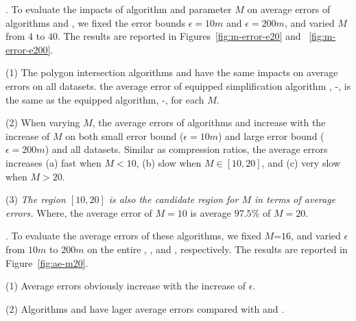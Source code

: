 .
To evaluate the impacts of algorithm \rpia and parameter $M$ on average errors of algorithms \cist and \cista, we fixed the error bounds {$\epsilon =10m$} and $\epsilon =200m$, and varied $M$ from $4$ to $40$.
The results are reported in Figures~\ref{fig:m-error-e20} and ~\ref{fig:m-error-e200}.


\ni(1) The polygon intersection algorithms \rpia and \cpia have the same impacts on average errors on all datasets. \eg the average error of \rpia equipped simplification algorithm \cist, \ie \cist-\rpia, is the same as the \cpia equipped algorithm, \ie \cist-\cpia, for each $M$.


\ni(2) When varying $M$, the average errors of algorithms \cist and \cista increase with the increase of $M$ on both small error bound {(\eg $\epsilon = 10m$)} and large error bound (\eg $\epsilon = 200m$) and all datasets.
Similar as compression ratios, the average errors increases (a) fast when $M < 10$, (b) slow when $M \in [10, 20]$, and (c) very slow when $M  > 20$.


\ni(3) \emph{The region $[10, 20]$ is also the candidate region for $M$ in terms of average errors.}
Where, the average error of $M=10$ is average {$97.5\%$} of $M=20$.




.
To evaluate the average errors of these algorithms, we fixed \textcolor[rgb]{0.00,0.07,1.00}{$M$=$16$}, and varied $\epsilon$ from $10m$ to $200m$ on the entire \truck, \sercar, \geolife and \pricar, respectively.
The results are reported in Figure~\ref{fig:ae-m20}. %

\ni(1) Average errors obviously increase with the increase of $\epsilon$.

\ni(2) Algorithms \cist and \cista have lager average errors compared with \dps and \squishe.








